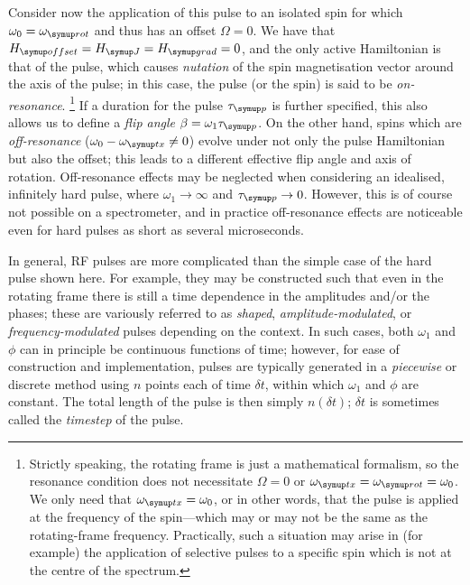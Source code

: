 Consider now the application of this pulse to an isolated spin for which $\omega_0 = \omegarot$ and thus has an offset $\Omega = 0$.
We have that $\Hoffset = \HJ = \Hgrad = 0$, and the only active Hamiltonian is that of the pulse, which causes \textit{nutation} of the spin magnetisation vector around the axis of the pulse; in this case, the pulse (or the spin) is said to be \textit{on-resonance}.%
\footnote{Strictly speaking, the rotating frame is just a mathematical formalism, so the resonance condition does not necessitate $\Omega = 0$ or $\omegatx = \omegarot = \omega_0$. We only need that $\omegatx = \omega_0$, or in other words, that the pulse is applied at the frequency of the spin---which may or may not be the same as the rotating-frame frequency. Practically, such a situation may arise in (for example) the application of selective pulses to a specific spin which is not at the centre of the spectrum.}
If a duration for the pulse $\taup$ is further specified, this also allows us to define a \textit{flip angle} $\beta = \omega_1 \taup$.
On the other hand, spins which are \textit{off-resonance} ($\omega_0 - \omegatx \neq 0$) evolve under not only the pulse Hamiltonian but also the offset; this leads to a different effective flip angle and axis of rotation.
Off-resonance effects may be neglected when considering an idealised, infinitely hard pulse, where $\omega_1 \to \infty$ and $\taup \to 0$.
However, this is of course not possible on a spectrometer, and in practice off-resonance effects are noticeable even for hard pulses as short as several microseconds.

In general, RF pulses are more complicated than the simple case of the hard pulse shown here.
For example, they may be constructed such that even in the rotating frame there is still a time dependence in the amplitudes and/or the phases; these are variously referred to as \textit{shaped}, \textit{amplitude-modulated}, or \textit{frequency-modulated} pulses depending on the context.
In such cases, both $\omega_1$ and $\phi$ can in principle be continuous functions of time; however, for ease of construction and implementation, pulses are typically generated in a \textit{piecewise} or discrete method using $n$ points each of time $\delta t$, within which $\omega_1$ and $\phi$ are constant.
The total length of the pulse is then simply $n(\delta t)$; $\delta t$ is sometimes called the \textit{timestep} of the pulse.
